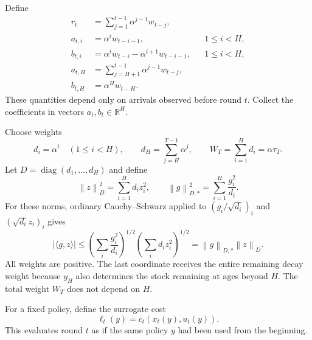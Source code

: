 \documentclass[11pt]{article}
\newcommand{\R}{\mathbb R}
\newcommand{\normD}[1]{\left\lVert #1\right\rVert_D}
\newcommand{\normDual}[1]{\left\lVert #1\right\rVert_{D,*}}
\begin{document}
Define
\begin{equation}
\label{eq:features}
\begin{aligned}
r_t&=\sum_{j=1}^{t-1}\alpha^{j-1}w_{t-j},\\
a_{t,i}&=\alpha^i w_{t-i-1},
&&1\le i<H,\\
b_{t,i}&=\alpha^i w_{t-i}-\alpha^{i+1}w_{t-i-1},
&&1\le i<H,\\
a_{t,H}&=\sum_{j=H+1}^{t-1}\alpha^{j-1}w_{t-j},\\
b_{t,H}&=\alpha^H w_{t-H}.
\end{aligned}
\end{equation}
These quantities depend only on arrivals observed before round $t$.
Collect the coefficients in vectors $a_t,b_t\in\R^H$.

Choose weights
\begin{equation}
\label{eq:weights}
d_i=\alpha^i\quad(1\le i<H),
\qquad
d_H=\sum_{j=H}^{T-1}\alpha^j,
\qquad
W_T=\sum_{i=1}^H d_i=\alpha\tau_T.
\end{equation}
Let $D=\operatorname{diag}(d_1,\ldots,d_H)$ and define
\[
\normD{z}^2=\sum_{i=1}^H d_i z_i^2,
\qquad
\normDual{g}^2=\sum_{i=1}^H\frac{g_i^2}{d_i}.
\]
For these norms, ordinary Cauchy--Schwarz applied to
$(g_i/\sqrt{d_i})_i$ and $(\sqrt{d_i}z_i)_i$ gives
\begin{equation}
\label{eq:weighted-duality}
|\langle g,z\rangle|
\le
\left(\sum_i\frac{g_i^2}{d_i}\right)^{1/2}
\left(\sum_i d_i z_i^2\right)^{1/2}
=\normDual{g}\normD{z}.
\end{equation}
All weights are positive. The last coordinate receives the entire
remaining decay weight because $y_H$ also determines the stock
remaining at ages beyond $H$. The total weight $W_T$ does not
depend on $H$.

For a fixed policy, define the surrogate cost
\begin{equation}
\label{eq:surrogate}
\ell_t(y)=c_t(x_t(y),u_t(y)).
\end{equation}
This evaluates round $t$ as if the same policy $y$ had been used
from the beginning.
\end{document}
